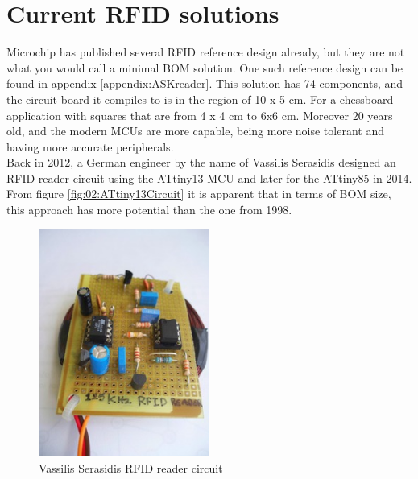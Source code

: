 \newpage
\section{Current RFID solutions}

Microchip has published several RFID reference design already, but they are not what you would call a minimal BOM solution. One such reference design can be found in appendix \ref{appendix:ASKreader}. This solution has 74 components, and the circuit board it compiles to is in the region of 10 x 5 cm. For a chessboard application with squares that are from 4 x 4 cm to 6x6 cm. Moreover 20 years old, and the modern MCUs are more capable, being more noise tolerant and having more accurate peripherals.\\


Back in 2012, a German engineer by the name of Vassilis Serasidis designed an RFID reader circuit using the ATtiny13 \cite{attiny13} MCU and later for the ATtiny85 \cite{attiny85} in 2014. From figure \ref{fig:02:ATtiny13Circuit} it is apparent that in terms of BOM size, this approach has more potential than the one from 1998.

\begin{figure}[H]
    \centering
    \includegraphics[width=0.5\textwidth]{02_Literature_study/figures/RFID_ATtiny13.jpg}
    \caption{Vassilis Serasidis RFID reader circuit}
    \label{fig:02:ATtiny13Physical}
\end{figure}

